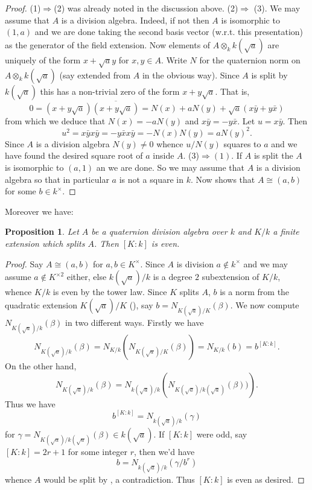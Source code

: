 \documentclass[11pt]{amsart}
\numberwithin{equation}{section}
\newtheorem{proposition}[equation]{Proposition}
\theoremstyle{remark}
\theoremstyle{remark}
\theoremstyle{remark}
\theoremstyle{definition}
\theoremstyle{definition}
\theoremstyle{definition}
\theoremstyle{definition}
\theoremstyle{definition}
\theoremstyle{definition}
\begin{document}
\begin{proof}
(1)$\Rightarrow$(2) was already noted in the discussion above. (2)$\Rightarrow$ (3). We may assume that $A$ is a division algebra. Indeed, if not then $A$ is isomorphic to $(1,a)$ and we are done taking the second basis vector (w.r.t. this presentation) as the generator of the field extension. Now elements of $A\otimes_k k(\sqrt{a})$ are uniquely of the form $x+\sqrt{a}y$ for $x,y\in A$. Write $N$ for the quaternion norm on $A\otimes_k k(\sqrt{a})$ (say extended from $A$ in the obvious way). Since $A$ is split by $k(\sqrt{a})$ this has a non-trivial zero of the form $x+y\sqrt{a}$. That is, 
\[0=(x+y\sqrt{a})\overline{(x+y\sqrt{a})}=N(x)+aN(y)+\sqrt{a}(x\bar{y}+y\bar{x})\]
from which we deduce that $N(x)=-aN(y)$ and $x\bar{y}=-y\bar{x}$. Let $u=x\bar{y}$. Then
\[u^2=x\bar{y}x\bar{y}=-y\bar{x}x\bar{y}=-N(x)N(y)=aN(y)^2.\]
Since $A$ is a division algebra $N(y)\neq 0$ whence $u/N(y)$ squares to $a$ and we have found the desired square root of $a$ inside $A$.
(3)$\Rightarrow (1)$. If $A$ is split the $A$ is isomorphic to $(a,1)$ an we are done. So we may assume that $A$ is a division algebra so that in particular $a$ is not a square in $k$. Now  shows that $A\cong (a,b)$ for some $b\in k^{\times}$.
\end{proof}

Moreover we have:

\begin{proposition}
Let $A$ be a quaternion division algebra over $k$ and $K/k$ a finite extension which splits $A$. Then $[K:k]$ is even. 
\end{proposition}

\begin{proof}
Say $A\cong (a,b)$ for $a,b\in  K^{\times}$. Since $A$ is division $a\notin k^{\times}$ and we may assume $a\notin K^{\times 2}$ either, else $k(\sqrt{a})/k$ is a degree $2$ subextension of $K/k$, whence $K/k$ is  even by the tower law.  Since $K$ splits $A$,  $b$ is a norm from the quadratic extension $K(\sqrt{a})/K$ (), say $b=N_{K(\sqrt{a})/K}(\beta)$. We now compute $N_{K(\sqrt{a})/k}(\beta)$ in two different ways. Firstly we have
\[N_{K(\sqrt{a})/k}(\beta)=N_{K/k}\left(N_{K(\sqrt{a})/K}(\beta)\right)=N_{K/k}(b)=b^{[K:k]}.\]
On the other hand, 
\[N_{K(\sqrt{a})/k}(\beta)=N_{k(\sqrt{a})/k}\left(N_{K(\sqrt{a})/k(\sqrt{a})}(\beta))\right).\]
Thus we have
\[b^{[K:k]}=N_{k(\sqrt{a})/k}(\gamma)\]
for $\gamma=N_{K(\sqrt{a})/k(\sqrt{a})}(\beta)\in k(\sqrt{a})$. If $[K:k]$ were odd, say $[K:k]=2r+1$ for some integer $r$, then we'd have
\[b=N_{k(\sqrt{a})/k}(\gamma/b^r)\]
whence $A$ would be split by , a contradiction. Thus $[K:k]$ is even as desired.
\end{proof}
\end{document}
